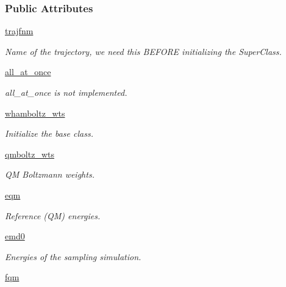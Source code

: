 \subsubsection*{\-Public \-Attributes}
\begin{DoxyCompactItemize}
\item 
\hyperlink{classforcebalance_1_1amberio_1_1AbInitio__AMBER_aa98530aa246d120abd213785d52728e7}{trajfnm}
\begin{DoxyCompactList}\small\item\em \-Name of the trajectory, we need this \-B\-E\-F\-O\-R\-E initializing the \-Super\-Class. \end{DoxyCompactList}\item 
\hyperlink{classforcebalance_1_1amberio_1_1AbInitio__AMBER_af08e6910f82424ed0b213b38b66be23f}{all\-\_\-at\-\_\-once}
\begin{DoxyCompactList}\small\item\em all\-\_\-at\-\_\-once is not implemented. \end{DoxyCompactList}\item 
\hyperlink{classforcebalance_1_1abinitio_1_1AbInitio_ae5c60f421336c2ecb716be16b8d51fdf}{whamboltz\-\_\-wts}
\begin{DoxyCompactList}\small\item\em \-Initialize the base class. \end{DoxyCompactList}\item 
\hyperlink{classforcebalance_1_1abinitio_1_1AbInitio_a5d7019720cce40eb336b82b5d0c74f87}{qmboltz\-\_\-wts}
\begin{DoxyCompactList}\small\item\em \-Q\-M \-Boltzmann weights. \end{DoxyCompactList}\item 
\hyperlink{classforcebalance_1_1abinitio_1_1AbInitio_a621b8b2fb62435de36c6895ba6ea09aa}{eqm}
\begin{DoxyCompactList}\small\item\em \-Reference (\-Q\-M) energies. \end{DoxyCompactList}\item 
\hyperlink{classforcebalance_1_1abinitio_1_1AbInitio_a975f07dd65ff96266fbd9fe2d9683ab3}{emd0}
\begin{DoxyCompactList}\small\item\em \-Energies of the sampling simulation. \end{DoxyCompactList}\item 
\hyperlink{classforcebalance_1_1abinitio_1_1AbInitio_a6b773c8a8a0134fdb4773eff6b23a4b9}{fqm}

\end{DoxyCompactItemize}
